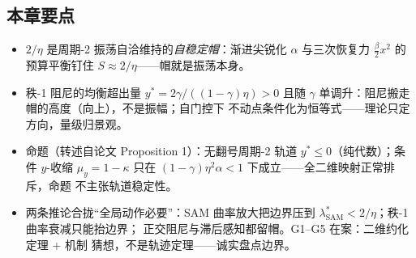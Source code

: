 \subsection*{本章要点}
\begin{itemize}
  \item $2/\eta$ 是周期-2 振荡自洽维持的\emph{自稳定帽}：渐进尖锐化
        $\alpha$ 与三次恢复力 $\tfrac{\beta}{2}x^2$ 的预算平衡钉住
        $S\approx2/\eta$——帽就是振荡本身。
  \item 秩-1 阻尼的均衡超出量 $y^{*}=2\gamma/((1-\gamma)\eta)>0$ 且随
        $\gamma$ 单调升：阻尼搬走帽的高度（向上），不是振幅；自门控下
        不动点条件化为恒等式——理论只定方向，量级归景观。
  \item 命题（转述自论文 Proposition 1）：无翻号周期-2 轨道
        $y^{*}\le0$（纯代数）；条件 $y$-收缩 $\mu_y=1-\kappa$ 只在
        $(1-\gamma)\eta^2\alpha<1$ 下成立——全二维映射正常排斥，命题
        不主张轨道稳定性。
  \item 两条推论合拢“全局动作必要”：SAM 曲率放大把边界压到
        $\lambda^{*}_{\mathrm{SAM}}<2/\eta$；秩-1 曲率衰减只能抬边界；
        正交阻尼与滞后感知都留帽。G1--G5 在案：二维约化定理 + 机制
        猜想，不是轨迹定理——诚实盘点边界。
\end{itemize}
